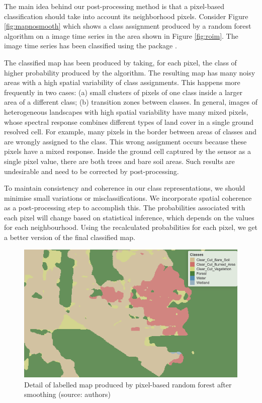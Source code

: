 \documentclass[
  shortnames]{jss}
\begin{document}
The main idea behind our post-processing method is that a pixel-based classification should take into account its neighborhood pixels. Consider Figure \ref{fig:mapnosmooth} which shows a class assignment produced by a random forest algorithm on a image time series in the area shown in Figure \ref{fig:roim}. The image time series has been classified using the  package \citep{Simoes2021}.

The classified map has been produced by taking, for each pixel, the class of higher probability produced by the algorithm. The resulting map has many noisy areas with a high spatial variability of class assignments. This happens more frequently in two cases: (a) small clusters of pixels of one class inside a larger area of a different class; (b) transition zones between classes. In general, images of heterogeneous landscapes with high spatial variability have many mixed pixels, whose spectral response combines different types of land cover in a single ground resolved cell. For example, many pixels in the border between areas of classes  and  are wrongly assigned to the  class. This wrong assignment occurs because these pixels have a mixed response. Inside the ground cell captured by the sensor as a single pixel value, there are both trees and bare soil areas. Such results are undesirable and need to be corrected by post-processing.

To maintain consistency and coherence in our class representations, we should minimise small variations or misclassifications. We incorporate spatial coherence as a post-processing step to accomplish this. The probabilities associated with each pixel will change based on statistical inference, which depends on the values for each neighbourhood. Using the recalculated probabilities for each pixel, we get a better version of the final classified map.

\begin{CodeChunk}
\begin{figure}[!h]

{\centering \includegraphics[width=0.7\linewidth]{images/map_smooth_v2} 

}

\caption[Detail of labelled map produced by pixel-based random forest after smoothing (source]{Detail of labelled map produced by pixel-based random forest after smoothing (source: authors)}\label{fig:mapsmooth}
\end{figure}
\end{CodeChunk}
\end{document}

